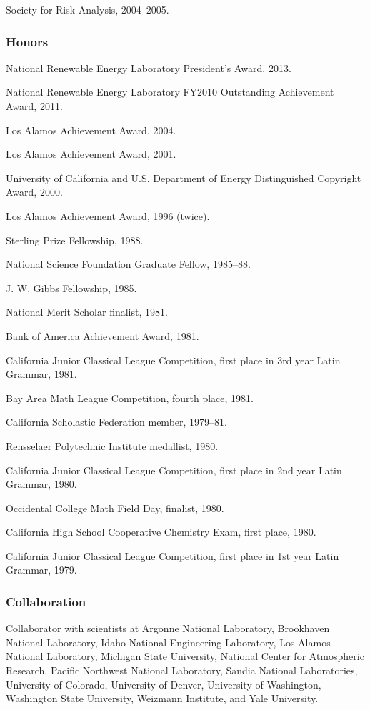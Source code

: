 \documentclass[]{article}
\begin{document}
Society for Risk Analysis, 2004--2005.

\subsubsection{Honors}\label{honors}

National Renewable Energy Laboratory President's Award, 2013.

National Renewable Energy Laboratory FY2010 Outstanding Achievement
Award, 2011.

Los Alamos Achievement Award, 2004.

Los Alamos Achievement Award, 2001.

University of California and U.S. Department of Energy Distinguished
Copyright Award, 2000.

Los Alamos Achievement Award, 1996 (twice).

Sterling Prize Fellowship, 1988.

National Science Foundation Graduate Fellow, 1985--88.

J. W. Gibbs Fellowship, 1985.

National Merit Scholar finalist, 1981.

Bank of America Achievement Award, 1981.

California Junior Classical League Competition, first place in 3rd year
Latin Grammar, 1981.

Bay Area Math League Competition, fourth place, 1981.

California Scholastic Federation member, 1979--81.

Rensselaer Polytechnic Institute medallist, 1980.

California Junior Classical League Competition, first place in 2nd year
Latin Grammar, 1980.

Occidental College Math Field Day, finalist, 1980.

California High School Cooperative Chemistry Exam, first place, 1980.

California Junior Classical League Competition, first place in 1st year
Latin Grammar, 1979.

\subsubsection{Collaboration}\label{collaboration}

Collaborator with scientists at Argonne National Laboratory, Brookhaven
National Laboratory, Idaho National Engineering Laboratory, Los Alamos
National Laboratory, Michigan State University, National Center for
Atmospheric Research, Pacific Northwest National Laboratory, Sandia
National Laboratories, University of Colorado, University of Denver,
University of Washington, Washington State University, Weizmann
Institute, and Yale University.
\end{document}

